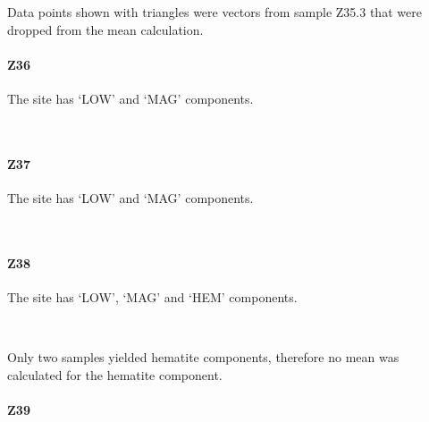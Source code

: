\documentclass[11pt]{article}
\begin{document}
    Data points shown with triangles were vectors from sample Z35.3 that
were dropped from the mean calculation.

    \paragraph{Z36}\label{z36}

    The site has `LOW' and `MAG' components.



    \begin{center}
    \end{center}
    { \hspace*{\fill} \\}
    
    \paragraph{Z37}\label{z37}

The site has `LOW' and `MAG' components.



    \begin{center}
    \end{center}
    { \hspace*{\fill} \\}
    
    \paragraph{Z38}\label{z38}

    The site has `LOW', `MAG' and `HEM' components.



    \begin{center}
    \end{center}
    { \hspace*{\fill} \\}
    
    Only two samples yielded hematite components, therefore no mean was
calculated for the hematite component.

    \paragraph{Z39}\label{z39}
\end{document}
